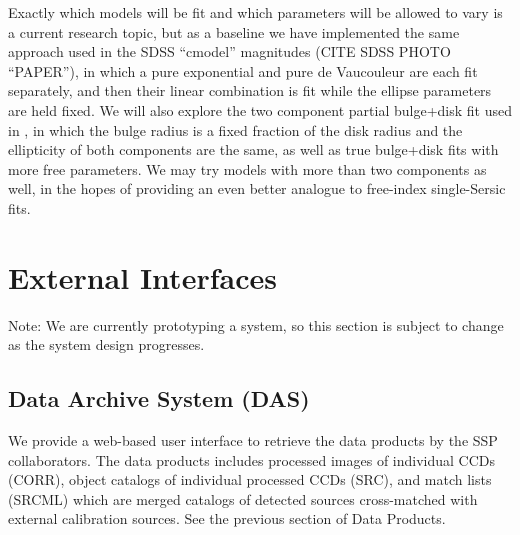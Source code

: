 \documentclass[12pt]{article}
\begin{document}
Exactly which models will be fit and which parameters will be allowed
to vary is a current research topic, but as a baseline we have
implemented the same approach used in the SDSS ``cmodel'' magnitudes
(CITE SDSS PHOTO ``PAPER''),
in which a pure exponential and pure de Vaucouleur are each fit
separately, and then their linear combination is fit while the ellipse
parameters are held fixed.  We will also explore the two component
partial bulge+disk fit used in \cite{Miller2013}, in which the bulge
radius is a fixed fraction of the disk radius and the ellipticity of
both components are the same, as well as true bulge+disk fits with
more free parameters.  We may try models with more than two components
as well, in the hopes of providing an even better analogue to
free-index single-Sersic fits.



\section{External Interfaces}
\label{sec:interfaces}

Note: We are currently prototyping a system, so this section is subject
to change as the system design progresses.

\subsection{Data Archive System (DAS)}
We provide a web-based user interface to retrieve the data products by
the SSP collaborators. The data products includes processed images of
individual CCDs (CORR), object catalogs of individual processed CCDs (SRC),
and  match lists (SRCML) which are merged catalogs of detected sources
cross-matched with external calibration sources. See the previous
section of Data Products.
\end{document}
